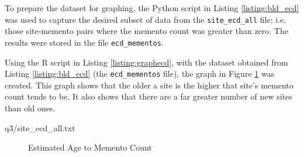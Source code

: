 \vspace{2mm}

\vspace{5mm}
To prepare the dataset for graphing, the Python script in Listing \ref{listing:bld_ecd} was used to capture the desired subset of data from the {\tt site\_ecd\_all} file; i.e, those site-memento pairs where the memento count was greater than zero. The results were stored in the file {\tt ecd\_mementos}. 
\vspace{2mm}

\vspace{5mm}
Using the R script in Listing \ref{listing:graphecd}, with the dataset obtained from Listing \ref{listing:bld_ecd} (the {\tt ecd\_mementos} file), the graph in Figure \ref{fig:ecdgraph} was created. This graph shows that the older a site is the higher that site's memento count tends to be. It also shows that there are a far greater number of new sites than old ones.
\vspace{2mm}

\newpage

{q3/site_ecd_all.txt}
\vspace{5mm}
\begin{figure}[h!]
\centering
{}
\caption{Estimated Age to Memento Count}
\label{fig:ecdgraph}
\end{figure}